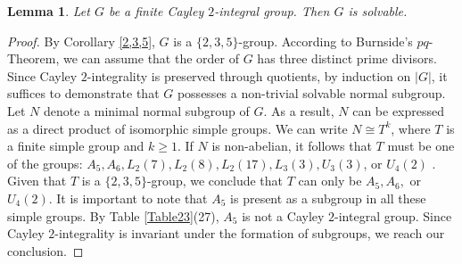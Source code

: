 \documentclass{amsart}
\newtheorem{lem}[thm]{Lemma}
\def \geq {\geqslant}
\begin{document}
		
		
		
		


\begin{lem}\label{solv}
	Let $G$ be a finite Cayley $2$-integral group. Then $G$ is solvable.
\end{lem}
\begin{proof}
By Corollary \ref{2,3,5}, \( G \) is a \( \{2,3,5\} \)-group. According to Burnside's \( pq \)-Theorem, we can assume that the order of \( G \) has three distinct prime divisors.  Since Cayley \( 2 \)-integrality is preserved through quotients, by induction on $|G|$, it suffices to demonstrate that \( G \) possesses a non-trivial solvable normal subgroup. 
Let \( N \) denote a minimal normal subgroup of \( G \). As a result, \( N \) can be expressed as a direct product of isomorphic simple groups. We can write \( N \cong T^k \), where \( T \) is a finite simple group and \( k \geq 1 \). If \( N \) is non-abelian, it follows that \( T \) must be one of the groups: \( A_5, A_6, L_2(7), L_2(8), L_2(17), L_3(3), U_3(3) \), or \( U_4(2) \) \cite[p.383]{Herzog}. Given that \( T \) is a \( \{2,3,5\} \)-group, we conclude that \( T \) can only be \( A_5, A_6, \) or \( U_4(2) \). 
It is important to note that \( A_5 \) is present as a subgroup in all these simple groups. By Table \ref{Table23}(27), $A_5$ is not a Cayley $2$-integral group. Since Cayley \( 2 \)-integrality is invariant under the formation of subgroups, we reach our conclusion.
\end{proof}
\end{document}
